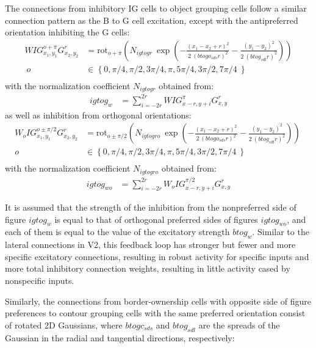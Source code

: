 The connections from inhibitory IG cells to object grouping cells follow a similar connection pattern as the B to G cell excitation, except with the antipreferred orientation inhibiting the G cells:
\begin{align}
  WIG^{o+\pi}_{x_1,y_1}G^{r}_{x_2,y_2}&=\text{rot}_{o+\pi}\left(N_{igtogr}\:
        \exp\left(-\frac{(x_1-x_2+r)^2}{2\: (btogo_{sds} r)^2}
                -\frac{(y_1-y_2)^2}{2\: (btog_{sdl} r)^2}\right)\right) \nonumber\\ \ o&\in \left\{0,\pi/4,\pi/2,3\pi/4,\pi,5\pi/4,3\pi/2,7\pi/4\ \right\} \nonumber\\
\end{align}
with the normalization coefficient $N_{igtogr}$  obtained from:
\begin{align}
	igtog_w&=\sum^{2r}_{i=-2r} WIG^{\pi}_{x-r,y+i}G^{r}_{x,y} 	
\end{align}
as well as inhibition from orthogonal orientations:
\begin{align}
	W_{o}IG^{o\pm\pi/2}_{x_1,y_1}G^{r}_{x_2,y_2}&=\text{rot}_{o\pm\pi/2}\left(N_{igtogro}\: \exp\left(-\frac{(x_1-x_2+r)^2}{2\: (btogo_{sds} r)^2}
        -\frac{(y_1-y_2)^2}{2\: (btog_{sdl} r)^2}\right)\right)\ \nonumber\\ o&\in
        \left\{0,\pi/4,\pi/2,3\pi/4,\pi,5\pi/4,3\pi/2,7\pi/4\ \right\} \nonumber\\ 
\end{align}
with the normalization coefficient $N_{igtogro}$ obtained from:
\begin{align}
	igtog_{wo}&=\sum^{2r}_{i=-2r} W_{o}IG^{\pi/2}_{x-r,y+i}G^{r}_{x,y} 	
\end{align}

It is assumed that the strength of the inhibition from the nonpreferred
side of figure $igtog_w$ is equal to that of orthogonal preferred sides
of figures $igtog_{wo}$, and each of them is equal to the value of the
excitatory strength $btog_w$. Similar to the lateral connections in
V2, this feedback loop has stronger but fewer and more specific
excitatory connections, resulting in robust activity for specific
inputs and more total inhibitory connection weights, resulting in
little activity cased by nonspecific inputs. 

Similarly, the connections from border-ownership cells with opposite side of figure preferences to contour grouping cells with the same preferred orientation consist of rotated 2D Gaussians,
where $btogc_{sds}$ and $btog_{sdl}$ are the spreads of the Gaussian in the radial and tangential directions, respectively:


